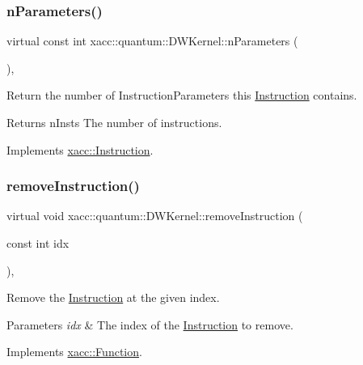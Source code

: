 \subsubsection{\texorpdfstring{n\+Parameters()}{nParameters()}}
{\footnotesize\ttfamily virtual const int xacc\+::quantum\+::\+D\+W\+Kernel\+::n\+Parameters (\begin{DoxyParamCaption}{ }\end{DoxyParamCaption})\hspace{0.3cm}{\ttfamily [inline]}, {\ttfamily [virtual]}}

Return the number of Instruction\+Parameters this \hyperlink{a01155}{Instruction} contains.

\begin{DoxyReturn}{Returns}
n\+Insts The number of instructions. 
\end{DoxyReturn}


Implements \hyperlink{a01155_ad54585d13c04ffd20296fff7ab8107ff}{xacc\+::\+Instruction}.

\mbox{\label{a00983_af2bcfd679e6cb89194f3f0bff8622b99}} 
\subsubsection{\texorpdfstring{remove\+Instruction()}{removeInstruction()}}
{\footnotesize\ttfamily virtual void xacc\+::quantum\+::\+D\+W\+Kernel\+::remove\+Instruction (\begin{DoxyParamCaption}\item[{const int}]{idx }\end{DoxyParamCaption})\hspace{0.3cm}{\ttfamily [inline]}, {\ttfamily [virtual]}}

Remove the \hyperlink{a01155}{Instruction} at the given index.


\begin{DoxyParams}{Parameters}
{\em idx} & The index of the \hyperlink{a01155}{Instruction} to remove. \\
\hline
\end{DoxyParams}


Implements \hyperlink{a01151_ab6478b09bb28e194bb555b3180737733}{xacc\+::\+Function}.

\mbox{\label{a00983_a75eb3560d2f81c9a5ae1cf765deb0e83}} 
